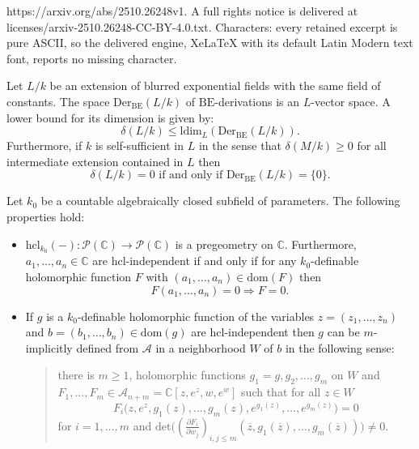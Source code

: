 \documentclass[10pt,a4paper]{amsart}
\newcommand{\BE}{\mathrm{BE}}
\begin{document}
https://arxiv.org/abs/2510.26248v1. A full rights notice is delivered at licenses/arxiv-2510.26248-CC-BY-4.0.txt. Characters: every retained excerpt is pure ASCII, so the delivered engine, XeLaTeX with its default Latin Modern text font, reports no missing character.
\begin{lem}\label{lemma-exponentialalgebra} 
Let $L/k$ be an extension of blurred exponential fields with the same field of constants. The space $\mathrm{Der}_{\BE}(L/k)$ of $\BE$-derivations is an $L$-vector space. A lower bound for its dimension is given by:
$$ \delta(L/k) \leq \mathrm{ldim}_L(\mathrm{Der}_{\BE}(L/k)).$$
Furthermore, if $k$ is self-sufficient in $L$ in the sense that $\delta(M/k) \geq 0$ for all intermediate extension contained in $L$ then 
$$ \delta(L/k) = 0 \text{ if and only if } \mathrm{Der}_{\BE}(L/k) = \lbrace 0 \rbrace.$$
\end{lem}

\begin{fact} \label{fact-Wilkie-complete}
Let $k_0$ be a countable algebraically closed subfield of parameters.
The following properties hold:
\begin{itemize} 
\item[(a)] $\mathrm{hcl}_{k_0}(-): \mathcal P(\mathbb{C}) \rightarrow \mathcal P(\mathbb{C})$ is a pregeometry on $\mathbb{C}$. Furthermore, $a_1,\ldots,a_n \in \mathbb{C}$ are $\mathrm{hcl}$-independent if and only if for any $k_0$-definable holomorphic function $F$ with $(a_1,\ldots,a_n) \in \mathrm{dom}(F)$ then 
$$ F(a_1,\ldots,a_n) = 0 \Rightarrow F = 0.$$

\item[(b)] If $g$ is a $k_0$-definable holomorphic function of the variables $z = (z_1,\ldots, z_n)$ and $ b = (b_1,\ldots,b_n) \in \mathrm{dom}(g)$ are $\mathrm{hcl}$-independent then $g$ can be $m$-implicitly defined from $\mathcal A$ in a neighborhood $W$ of $b$ in the following sense: 

\begin{quote} 
there is $m \geq 1$, holomorphic functions $g_1 = g, g_2,\ldots,g_m$ on $W$ and $F_1,\ldots,F_m \in \mathcal A_{n + m} = \mathbb{C}[z,e^{z},w,e^{w}]$ such that for all $z \in W$ 
$$ F_i\Big(z,e^{z}, g_1(z), \ldots, g_m(z), e^{g_1(z)}, \ldots, e^{g_m(z)} \Big) = 0 $$
for $i = 1,\ldots, m$ and $\mathrm{det}\Big((\frac{\partial F_i} {\partial w_j})_{i,j \leq m}(\overline{z}, g_1(\overline{z}),\ldots, g_m(\overline{z})) \Big)\neq 0$.
\end{quote}
\end{itemize}
\end{fact}
\end{document}
